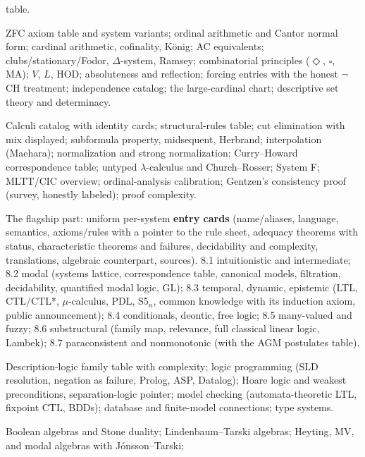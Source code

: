\documentclass[11pt,letterpaper]{article}
\begin{document}
\begin{description}[style=nextline]
    table.
  \item[Part 6 --- Set Theory.]
    ZFC axiom table and system variants; ordinal arithmetic and
    Cantor normal form; cardinal arithmetic, cofinality, K\"onig; AC
    equivalents; clubs/stationary/Fodor, $\Delta$-system, Ramsey;
    combinatorial principles ($\Diamond$, $\square$, MA); $V$, $L$,
    HOD; absoluteness and reflection; forcing entries with the honest
    $\neg$CH treatment; independence catalog; the large-cardinal
    chart; descriptive set theory and determinacy.
  \item[Part 7 --- Proof Theory and $\lambda$-Calculi.]
    Calculi catalog with identity cards; structural-rules table; cut
    elimination with mix displayed; subformula property, midsequent,
    Herbrand; interpolation (Maehara); normalization and strong
    normalization; Curry--Howard correspondence table; untyped
    $\lambda$-calculus and Church--Rosser; System F; MLTT/CIC
    overview; ordinal-analysis calibration; Gentzen's consistency
    proof (survey, honestly labeled); proof complexity.
  \item[Part 8 --- Nonclassical Logics.]
    The flagship part: uniform per-system \textbf{entry cards}
    (name/aliases, language, semantics, axioms/rules with a pointer to
    the rule sheet, adequacy theorems with status, characteristic
    theorems and failures, decidability and complexity, translations,
    algebraic counterpart, sources).  8.1 intuitionistic and
    intermediate; 8.2 modal (systems lattice, correspondence table,
    canonical models, filtration, decidability, quantified modal
    logic, GL); 8.3 temporal, dynamic, epistemic (LTL, CTL/CTL*,
    $\mu$-calculus, PDL, S5$_n$, common knowledge with its induction
    axiom, public announcement); 8.4 conditionals, deontic, free
    logic; 8.5 many-valued and fuzzy; 8.6 substructural (family map,
    relevance, full classical linear logic, Lambek); 8.7
    paraconsistent and nonmonotonic (with the AGM postulates table).
  \item[Part 9 --- Logic in Computer Science.]
    Description-logic family table with complexity; logic programming
    (SLD resolution, negation as failure, Prolog, ASP, Datalog);
    Hoare logic and weakest preconditions, separation-logic pointer;
    model checking (automata-theoretic LTL, fixpoint CTL, BDDs);
    database and finite-model connections; type systems.
  \item[Part 10 --- Algebraic and Categorical Logic.]
    Boolean algebras and Stone duality; Lindenbaum--Tarski algebras;
    Heyting, MV, and modal algebras with J\'onsson--Tarski;

\end{description}
\end{document}
